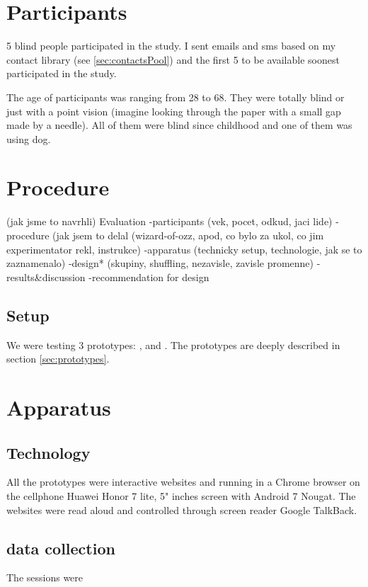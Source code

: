 \documentclass[11pt,twoside,a4paper]{book}
\begin{document}
	\section{Participants}
	
	5 blind people participated in the study. I sent emails and sms based on my contact library (see \ref{sec:contactsPool}) and the first 5 to be available soonest participated in the study. 
	
	The age of participants was ranging from 28 to 68.
	They were totally blind or just with a point vision (imagine looking through the paper with a small gap made by a needle).
	All of them were blind since childhood and one of them was using dog.
	\section{Procedure}
	(jak jsme to navrhli)
	Evaluation
	-participants (vek, pocet, odkud, jaci lide)
	-procedure (jak jsem to delal (wizard-of-ozz, apod, co bylo za ukol, co jim experimentator rekl, instrukce)
	-apparatus (technicky setup, technologie, jak se to zaznamenalo)
	-design* (skupiny, shuffling, nezavisle, zavisle promenne)
	-results\&discussion
	-recommendation for design
	
	\subsection{Setup}
	We were testing 3 prototypes: \poi{}, \reversegeo{} and \gps{}. The prototypes are deeply described in section \ref{sec:prototypes}. 
	\subsection{}
	\section{Apparatus}
	\subsection{Technology}
	All the prototypes were interactive websites and running in a Chrome browser on the cellphone Huawei Honor 7 lite, 5" inches screen with Android 7 Nougat. The websites were read aloud and controlled through screen reader Google TalkBack\cite{later}.
	\subsection{data collection}
	The sessions were
	
\end{document}
